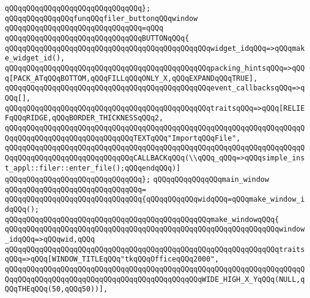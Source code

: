 \verb|qQQqqQQqqQQqqQQqqQQqqQQqqQQqqQQq};|\newline
\newline
\newline
\verb|qQQqqQQqqQQqqQQqfunqQQqfiler_buttonqQQqwindow|\newline
\verb|qQQqqQQqqQQqqQQqqQQqqQQqqQQqqQQq=qQQq|\newline
\verb|qQQqqQQqqQQqqQQqqQQqqQQqqQQqqQQqBUTTONqQQq{|\newline
\verb|qQQqqQQqqQQqqQQqqQQqqQQqqQQqqQQqqQQqqQQqqQQqqQQqwidget_idqQQq=>qQQqmake_widget_id(),|\newline
\verb|qQQqqQQqqQQqqQQqqQQqqQQqqQQqqQQqqQQqqQQqqQQqqQQqpacking_hintsqQQq=>qQQq[PACK_ATqQQqBOTTOM,qQQqFILLqQQqONLY_X,qQQqEXPANDqQQqTRUE],|\newline
\verb|qQQqqQQqqQQqqQQqqQQqqQQqqQQqqQQqqQQqqQQqqQQqqQQqevent_callbacksqQQq=>qQQq[],|\newline
\verb|qQQqqQQqqQQqqQQqqQQqqQQqqQQqqQQqqQQqqQQqqQQqqQQqtraitsqQQq=>qQQq[RELIEFqQQqRIDGE,qQQqBORDER_THICKNESSqQQq2,|\newline
\verb|qQQqqQQqqQQqqQQqqQQqqQQqqQQqqQQqqQQqqQQqqQQqqQQqqQQqqQQqqQQqqQQqqQQqqQQqqQQqqQQqqQQqqQQqqQQqqQQqqQQqTEXTqQQq"ImportqQQqFile",|\newline
\verb|qQQqqQQqqQQqqQQqqQQqqQQqqQQqqQQqqQQqqQQqqQQqqQQqqQQqqQQqqQQqqQQqqQQqqQQqqQQqqQQqqQQqqQQqqQQqqQQqqQQqCALLBACKqQQq(\\qQQq_qQQq=>qQQqsimple_inst_appl::filer::enter_file();qQQqendqQQq)]|\newline
\verb|qQQqqQQqqQQqqQQqqQQqqQQqqQQqqQQq};|\newline
\newline
\verb|qQQqqQQqqQQqqQQqmain_window|\newline
\verb|qQQqqQQqqQQqqQQqqQQqqQQqqQQqqQQq=|\newline
\verb|qQQqqQQqqQQqqQQqqQQqqQQqqQQqqQQq{qQQqqQQqqQQqwidqQQq=qQQqmake_window_idqQQq();|\newline
\newline
\verb|qQQqqQQqqQQqqQQqqQQqqQQqqQQqqQQqqQQqqQQqqQQqqQQqmake_windowqQQq{|\newline
\verb|qQQqqQQqqQQqqQQqqQQqqQQqqQQqqQQqqQQqqQQqqQQqqQQqqQQqqQQqqQQqqQQqwindow_idqQQq=>qQQqwid,qQQq|\newline
\verb|qQQqqQQqqQQqqQQqqQQqqQQqqQQqqQQqqQQqqQQqqQQqqQQqqQQqqQQqqQQqqQQqtraitsqQQq=>qQQq[WINDOW_TITLEqQQq"tkqQQqOfficeqQQq2000",|\newline
\verb|qQQqqQQqqQQqqQQqqQQqqQQqqQQqqQQqqQQqqQQqqQQqqQQqqQQqqQQqqQQqqQQqqQQqqQQqqQQqqQQqqQQqqQQqqQQqqQQqqQQqqQQqqQQqqQQqqQQqWIDE_HIGH_X_YqQQq(NULL,qQQqTHEqQQq(50,qQQq50))],|\newline
